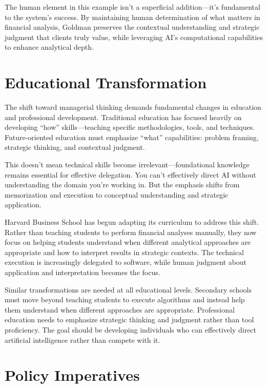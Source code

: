 \documentclass[
  Letterpaper,
]{scrbook}
\begin{document}
The human element in this example isn't a superficial addition---it's
fundamental to the system's success. By maintaining human determination
of what matters in financial analysis, Goldman preserves the contextual
understanding and strategic judgment that clients truly value, while
leveraging AI's computational capabilities to enhance analytical depth.

\section{Educational Transformation}\label{educational-transformation}

The shift toward managerial thinking demands fundamental changes in
education and professional development. Traditional education has
focused heavily on developing ``how'' skills---teaching specific
methodologies, tools, and techniques. Future-oriented education must
emphasize ``what'' capabilities: problem framing, strategic thinking,
and contextual judgment.

This doesn't mean technical skills become irrelevant---foundational
knowledge remains essential for effective delegation. You can't
effectively direct AI without understanding the domain you're working
in. But the emphasis shifts from memorization and execution to
conceptual understanding and strategic application.

Harvard Business School has begun adapting its curriculum to address
this shift. Rather than teaching students to perform financial analyses
manually, they now focus on helping students understand when different
analytical approaches are appropriate and how to interpret results in
strategic contexts. The technical execution is increasingly delegated to
software, while human judgment about application and interpretation
becomes the focus.

Similar transformations are needed at all educational levels. Secondary
schools must move beyond teaching students to execute algorithms and
instead help them understand when different approaches are appropriate.
Professional education needs to emphasize strategic thinking and
judgment rather than tool proficiency. The goal should be developing
individuals who can effectively direct artificial intelligence rather
than compete with it.

\section{Policy Imperatives}\label{policy-imperatives}
\end{document}
